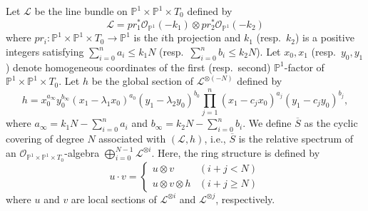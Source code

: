 \documentclass[letterpaper, 11pt]{amsart}
\theoremstyle{my theoremstyle}
\theoremstyle{dfn}
\theoremstyle{remark}
\renewcommand{\1}{\mathbbm{1}}
\renewcommand{\P}{\mathbb{P}}
\renewcommand{\l}{\lambda}
\numberwithin{equation}{section}
\begin{document}
Let $\mathscr{L}$ be the line bundle on $\P^1 \times \P^1 \times T_0$ defined by
\begin{equation*}
\mathscr{L} = pr_1^*\mathscr{O}_{\P^1}(-k_1)\otimes pr_2^*\mathscr{O}_{\P^1}(-k_2)
\end{equation*}
where $pr_i\colon \P^1\times \P^1\times T_0\to\P^1$ is the $i$th projection and $k_1$ (resp.~$k_2$) is a positive integers satisfying $\sum_{i=0}^{n}a_i\le k_1N$ (resp.~$\sum_{i=0}^{n}b_i\le k_2N$).
Let $x_0,x_1$ (resp.~$y_0,y_1$) denote homogeneous coordinates of the first (resp.~second) $\P^1$-factor of $\P^1\times \P^1\times T_0$.
Let $h$ be the global section of $\mathscr{L}^{\otimes(-N)}$ defined by 
\begin{equation*}
h= x_0^{a_{\infty}}y_0^{b_{\infty}}(x_1-\l_1x_0)^{a_0}(y_1-\l_2y_0)^{b_0} \prod_{j=1}^n (x_1-c_jx_0)^{a_j} (y_1-c_jy_0)^{b_j},
\end{equation*}
where $a_\infty=k_1N-\sum_{i=0}^{n}a_i$ and $b_\infty=k_2N-\sum_{i=0}^{n}b_i$.
We define $\overline{S}$ as the cyclic covering of degree $N$ associated with $(\mathscr{L},h)$, i.e., $\overline{S}$ is the relative spectrum of an $\mathscr{O}_{\P^1\times \P^1\times T_0}$-algebra $\bigoplus_{i=0}^{N-1}\mathscr{L}^{\otimes i}$.
Here, the ring structure is defined by 
\begin{equation*}
u\cdot v = \begin{cases}
u\otimes v & (i+j<N)\\
u\otimes v\otimes h & (i+j\geq N)
\end{cases}
\end{equation*}
where $u$ and $v$ are local sections of $\mathscr{L}^{\otimes i}$ and $\mathscr{L}^{\otimes j}$, respectively.
\end{document}
